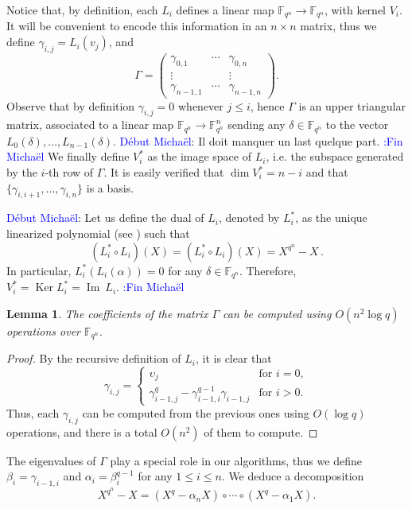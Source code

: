 \documentclass{sig-alternate}
\newcommand{\ff}[1]{\mathbb{F}_{#1}}
\newcommand{\qq}{q}
\newcommand{\nn}{n}
\newcommand{\qn}{{\qq^\nn}}
\newcommand{\extf}{\ff{\qn}}
\DeclareMathOperator{\Ker}{Ker}
\DeclareMathOperator{\Ima}{Im}
\newcounter{algo}
\newcommand{\comd}{\noindent \textcolor{blue}{D\'ebut Micha\"el}:}
\newcommand{\comf}{\noindent \textcolor{blue}{:Fin Micha\"el}}
\newtheorem{Lem}{Lemma}
\begin{document}
Notice that, by definition, each $L_i$ defines a linear map
$\extf\to\extf$, with kernel $V_i$. It will be convenient to encode
this information in an $\nn\times\nn$ matrix, thus we define
$\gamma_{i,j}=L_i(v_j)$, and
\begin{equation}
  \label{eq:Gamma}
  \Gamma =
  \begin{pmatrix}
    \gamma_{0,1} & \cdots & \gamma_{0,\nn}\\
    \vdots & & \vdots\\
    \gamma_{\nn-1,1} & \cdots & \gamma_{\nn-1,\nn}
  \end{pmatrix}.
\end{equation}
Observe that by definition $\gamma_{i,j}=0$ whenever $j\le i$, hence
$\Gamma$ is an upper triangular matrix, associated to a linear map
$\extf\to\extf^\nn$ sending any $\delta\in\extf$ to the vector
$L_0(\delta),\dots,L_{n-1}(\delta)$.  
\comd
 Il doit manquer un last quelque part.
\comf
We finally define $V_i^\ast$ as
the image space of $L_i$, i.e. the subspace generated by the $i$-th
row of $\Gamma$.  It is easily verified that $\dim V_i^\ast=n-i$ and
that $\{\gamma_{i,i+1},\dots,\gamma_{i,\nn}\}$ is a basis.

\comd
Let us define the dual of $L_i$, denoted by $L_i^\ast$, as the unique linearized polynomial (see
\cite[Ch. 11]{Berlekamp1984}) such that 
$$(L_i^\ast \circ L_i)(X)=(L_i^\ast \circ L_i)(X)=X^\qn-X\,.$$
In particular, $L_i^\ast(L_i(\alpha))=0$ for any $\delta \in \extf$. Therefore, $V_i^\ast=\Ker L_i^\ast=\Ima~L_i$.
\comf


\begin{Lem}
  The coefficients of the matrix $\Gamma$ can be computed using
  $O(\nn^2\log\qq)$ operations over $\extf$.
\end{Lem}
\begin{proof}
  By the recursive definition of $L_i$, it is clear that
  \begin{equation}
    \gamma_{i,j} =
    \begin{cases}
      \upsilon_j &\text{for $i=0$},\\
      \gamma_{i-1,j}^\qq - \gamma_{i-1,i}^{\qq-1}\gamma_{i-1,j} &\text{for $i>0$}.
    \end{cases}
  \end{equation}
  Thus, each $\gamma_{i,j}$ can be computed from the previous ones
  using $O(\log\qq)$ operations, and there is a total $O(\nn^2)$ of
  them to compute.
\end{proof}

The eigenvalues of $\Gamma$ play a special role in our algorithms,
thus we define $\beta_i=\gamma_{i-1,i}$ and $\alpha_i=\beta_i^{\qq-1}$
for any $1\le i \le \nn$. We deduce a decomposition
\begin{equation}
  X^\qn - X = (X^\qq - \alpha_\nn X) \circ \cdots \circ (X^\qq - \alpha_1 X).
\end{equation}
\end{document}
